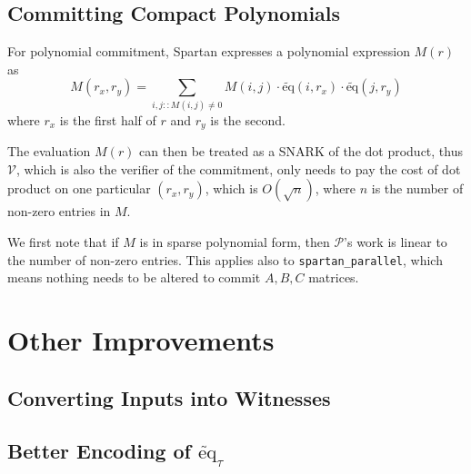 \documentclass{article}
\newcommand{\code}{\texttt}
\renewcommand{\P}{\mathcal{P}}
\newcommand{\V}{\mathcal{V}}
\newcommand{\eq}{\widetilde{\mbox{eq}}}
\begin{document}
\subsection{Committing Compact Polynomials}
For polynomial commitment, Spartan expresses a polynomial expression $M(r)$ as
$$\displaystyle M(r_x, r_y) = \sum_{i, j :: M(i, j)\neq 0} M(i, j)\cdot \eq(i, r_x)\cdot\eq(j, r_y)$$
where $r_x$ is the first half of $r$ and $r_y$ is the second.

The evaluation $M(r)$ can then be treated as a SNARK of the dot product, thus $\V$, which is also the verifier of the commitment, only needs to pay the cost of dot product on one particular $(r_x, r_y)$, which is $O(\sqrt{n})$, where $n$ is the number of non-zero entries in $M$.

We first note that if $M$ is in sparse polynomial form, then $\P$'s work is linear to the number of non-zero entries. This applies also to \code{spartan\_parallel}, which means nothing needs to be altered to commit $A, B, C$ matrices.

\section{Other Improvements}

\subsection{Converting Inputs into Witnesses}

\subsection{Better Encoding of $\eq_\tau$}
\end{document}
